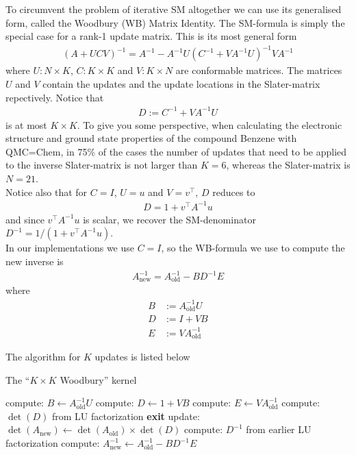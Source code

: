 \documentclass[11pt]{article}
\numberwithin{figure}{section}
\numberwithin{table}{section}
\begin{document}
      To circumvent the problem of iterative SM altogether we can use its generalised form, called the Woodbury (WB) Matrix Identity. The SM-formula is simply the special case for a rank-1 update matrix. This is its most general form
      \begin{align}
        \left(A+UCV\right)^{-1} = A^{-1} - A^{-1}U(C^{-1}+VA^{-1}U)^{-1}VA^{-1}
      \end{align}
      where $U:N\times K$, $C:K\times K$ and $V:K\times N$ are conformable matrices. The matrices $U$ and $V$ contain the updates and the update locations in the Slater-matrix repectively. Notice that
      \begin{align}\label{eqn:wb-denom}
        D:=C^{-1}+VA^{-1}U
      \end{align}  is at most $K\times K$. To give you some perspective, when calculating the electronic structure and ground state properties of the compound Benzene with QMC=Chem, in 75\% of the cases the number of updates that need to be applied to the inverse Slater-matrix is not larger than $K=6$, whereas the Slater-matrix is $N=21$.\\
      
      Notice also that for $C=I$, $U=u$ and $V=v^\top$, $D$ reduces to
      \begin{align}
        D = 1 + v^\top A^{-1} u
      \end{align}
      and since $v^\top A^{-1} u$ is scalar, we recover the SM-denominator $D^{-1}=1/\left(1 + v^\top A^{-1} u\right)$.\\
      
      In our implementations we use $C=I$, so the WB-formula we use to compute the new inverse is
      \begin{align}
        A_{\text{new}}^{-1}=A_{\text{old}}^{-1}-BD^{-1}E
      \end{align}
      where 
      \begin{align}
        B&:=A_{\text{old}}^{-1}U \\
        D&:=I+VB \\
        E&:=VA_{\text{old}}^{-1}
      \end{align}
      
      The algorithm for $K$ updates is listed below\\
      
      \begin{algorithm}[H]
        \caption{The ``$K\times K$ Woodbury'' kernel}\label{algo:woodbury}
        compute: $B \gets A_{\text{old}}^{-1} U$\;
        compute: $D \gets 1 + V B$\;
        compute: $E \gets V A_{\text{old}}^{-1}$\;
        compute: $\det(D)$ from LU factorization\;
        {
          \textbf{exit}\;
        }
        update: $\det(A_{\text{new}})\gets \det(A_{\text{old}})\times\det(D)$\;
        compute: $D^{-1}$ from earlier LU factorization\;
        compute: $A_{\text{new}}^{-1} \gets A_{\text{old}}^{-1}-BD^{-1}E$\;
      \end{algorithm}
		
\end{document}
